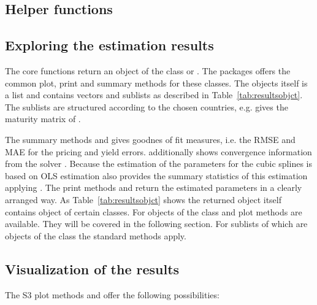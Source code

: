 \subsection{Helper functions}
\label{sec:helper-functions}


\subsection{Exploring the estimation results}
\label{sec:expl-estim-results}


The core functions return an object of the class  or . The packages offers the common
 plot, print and summary methods for these classes. The objects itself is a list and contains vectors and sublists as described in Table~\ref{tab:resultsobjct}. The sublists are structured according to the chosen countries, e.g.  gives the maturity matrix of . 



The summary methods  and  gives goodnes of fit measures, i.e. the RMSE and MAE for the pricing and yield errors.  additionally shows convergence information from the solver .
Because the estimation of the parameters for the cubic splines is based on OLS estimation  also provides the summary statistics of this estimation applying . The print methods  and  return the estimated parameters in a clearly arranged way.
As Table~\ref{tab:resultsobjct} shows the returned object itself contains object of certain classes. For objects of the class  and  plot methods are available. They will be covered in the following section. For sublists of  which are objects of the class  the standard  methods apply.  

\subsection{Visualization of the results}
\label{sec:visu-results}

The S3 plot methods  and  offer the following possibilities:

